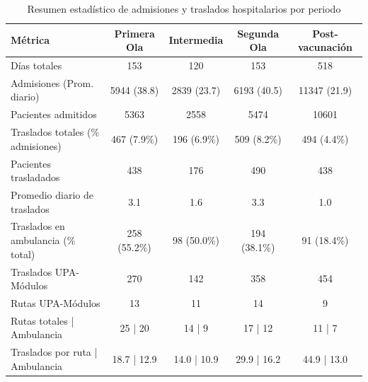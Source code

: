 \begin{table}[htbp]
\centering
\caption{Resumen estadístico de admisiones y traslados hospitalarios por periodo}
\label{tab:resumen_traslados}
\begin{tabular}{lcccc}
\toprule
Métrica & Primera Ola & Intermedia & Segunda Ola & Post-vacunación \\
\midrule
Días totales & 153 & 120 & 153 & 518 \\
Admisiones (Prom. diario) & 5944 (38.8) & 2839 (23.7) & 6193 (40.5) & 11347 (21.9) \\
Pacientes admitidos & 5363 & 2558 & 5474 & 10601 \\
Traslados totales (\% admisiones) & 467 (7.9\%) & 196 (6.9\%) & 509 (8.2\%) & 494 (4.4\%) \\
Pacientes trasladados & 438 & 176 & 490 & 438 \\
Promedio diario de traslados & 3.1 & 1.6 & 3.3 & 1.0 \\
Traslados en ambulancia (\% total) & 258 (55.2\%) & 98 (50.0\%) & 194 (38.1\%) & 91 (18.4\%) \\
Traslados UPA-Módulos & 270 & 142 & 358 & 454 \\
Rutas UPA-Módulos & 13 & 11 & 14 & 9 \\
Rutas totales | Ambulancia & 25 | 20 & 14 | 9 & 17 | 12 & 11 | 7 \\
Traslados por ruta | Ambulancia & 18.7 | 12.9 & 14.0 | 10.9 & 29.9 | 16.2 & 44.9 | 13.0 \\
\bottomrule
\end{tabular}
\end{table}
